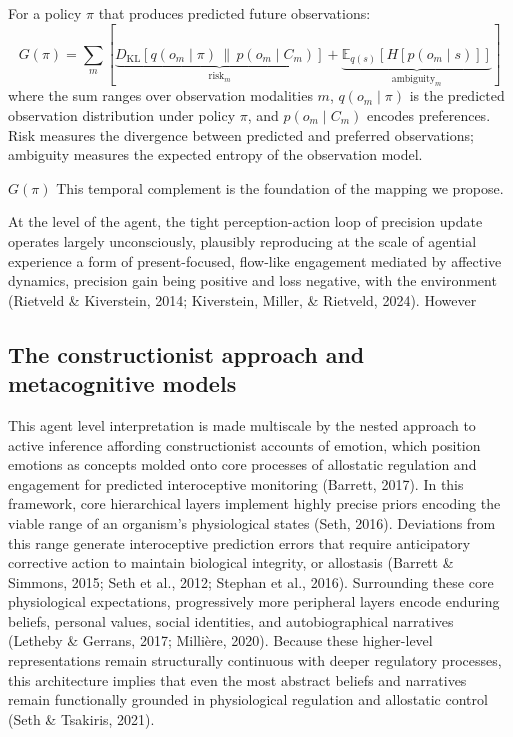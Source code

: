 \documentclass[11pt,a4paper]{article}
\begin{document}
For a policy $\pi$ that produces predicted future observations:
\begin{equation}
    G(\pi) = \sum_m \left[\underbrace{D_{\mathrm{KL}}[q(o_m \mid \pi) \,\|\, p(o_m \mid C_m)]}_{\text{risk}_m} + \underbrace{\mathbb{E}_{q(s)}[H[p(o_m \mid s)]]}_{\text{ambiguity}_m}\right]
\end{equation}
where the sum ranges over observation modalities $m$, $q(o_m \mid \pi)$ is the predicted observation distribution under policy $\pi$, and $p(o_m \mid C_m)$ encodes preferences. Risk measures the divergence between predicted and preferred observations; ambiguity measures the expected entropy of the observation model.

$G(\pi)$ This temporal complement is the foundation of the mapping we propose.

At the level of the agent, the tight perception-action loop of precision update operates largely unconsciously, plausibly reproducing at the scale of agential experience a form of present-focused, flow-like engagement mediated by affective dynamics, precision gain being positive and loss negative, with the environment (Rietveld \& Kiverstein, 2014; Kiverstein, Miller, \& Rietveld, 2024). However


\subsection{The constructionist approach and metacognitive models}



This agent level interpretation is made multiscale by the nested approach to active inference affording constructionist accounts of emotion, which position emotions as concepts molded onto core processes of allostatic regulation and engagement for predicted interoceptive monitoring (Barrett, 2017). In this framework, core hierarchical layers implement highly precise priors encoding the viable range of an organism's physiological states (Seth, 2016). Deviations from this range generate interoceptive prediction errors that require anticipatory corrective action to maintain biological integrity, or allostasis (Barrett \& Simmons, 2015; Seth et al., 2012; Stephan et al., 2016). Surrounding these core physiological expectations, progressively more peripheral layers encode enduring beliefs, personal values, social identities, and autobiographical narratives (Letheby \& Gerrans, 2017; Millière, 2020). Because these higher-level representations remain structurally continuous with deeper regulatory processes, this architecture implies that even the most abstract beliefs and narratives remain functionally grounded in physiological regulation and allostatic control (Seth \& Tsakiris, 2021).
\end{document}
